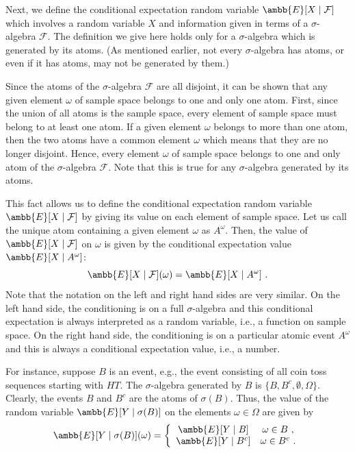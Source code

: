 \documentclass[12pt]{article} %
\newcommand{\mE}{\ambb{E}}
\newcommand{\cF}{\mathcal{F}}
\begin{document}
Next, we define the conditional expectation random variable
$\mE[X\mid\cF]$ which involves a random variable $X$ and information
given in terms of a $\sigma$-algebra $\cF$. The definition we give here
holds only for a $\sigma$-algebra which is generated by its atoms. (As
mentioned earlier, not every $\sigma$-algebra has atoms, or even if it
has atoms, may not be generated by them.)

Since the atoms of the $\sigma$-algebra $\cF$ are all disjoint, it can
be shown that any given element $\omega$ of sample space belongs to
one and only one atom. First, since the union of all atoms is the
sample space, every element of sample space must belong to at least
one atom. If a given element $\omega$ belongs to more than one atom,
then the two atoms have a common element $\omega$ which means that
they are no longer disjoint. Hence, every element $\omega$ of sample
space belongs to one and only atom of the $\sigma$-algebra $\cF$. Note
that this is true for any $\sigma$-algebra generated by its atoms.

This fact allows us to define the conditional expectation random
variable $\mE[X\mid\cF]$ by giving its value on each element of sample
space. Let us call the unique atom containing a given element $\omega$
as $A^\omega$. Then, the value of $\mE[X\mid \cF]$ on $\omega$ is given
by the conditional expectation value $\mE[X\mid A^\omega]$:
\begin{equation}
  \mE[X\mid\cF](\omega) = \mE[X\mid A^\omega]\ .
\end{equation}
Note that the notation on the left and right hand sides are very
similar. On the left hand side, the conditioning is on a full
$\sigma$-algebra and this conditional expectation is always
interpreted as a random variable, i.e., a function on sample space. On
the right hand side, the conditioning is on a particular atomic event
$A^\omega$ and this is always a conditional expectation value, i.e., a
number.

For instance, suppose $B$ is an event, e.g., the event consisting of
all coin toss sequences starting with $HT$. The $\sigma$-algebra
generated by $B$ is $\{B, B^c, \emptyset, \Omega\}$. Clearly, the
events $B$ and $B^c$ are the atoms of $\sigma(B)$. Thus, the value of
the random variable $\mE[Y\mid \sigma(B)]$ on the elements
$\omega \in \Omega$ are given by
\begin{equation}
  \mE[Y\mid\sigma(B)](\omega) = \left\{\begin{array}{cc} \mE[Y\mid B] & \omega \in B\ ,\\ \mE[Y \mid B^c] & \omega \in B^c\ . \end{array}\right.
\end{equation}
\end{document}
